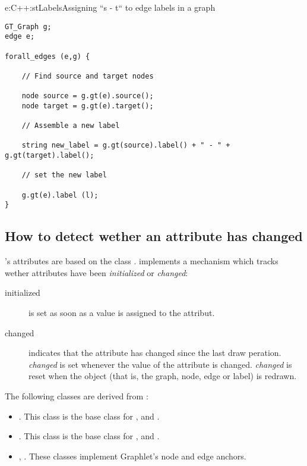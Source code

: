 \documentclass[twoside,fleqn]{report}
\begin{document}
\begin{example}{e:C++:stLabels}{Assigning ``s - t`` to edge labels in a 
graph}
\begin{verbatim}
GT_Graph g;
edge e;

forall_edges (e,g) {

    // Find source and target nodes

    node source = g.gt(e).source();
    node target = g.gt(e).target();

    // Assemble a new label

    string new_label = g.gt(source).label() + " - " + g.gt(target).label();
    
    // set the new label

    g.gt(e).label (l);
}
\end{verbatim}
\end{example}


%
%

\subsection{How to detect wether an attribute has changed}
\label{s:DetectingChangesInAttributes}

\Graphlet{}'s attributes are based on the class
.   implements a
mechanism which tracks wether attributes have been
\emph{initialized} or \emph{changed}:

\begin{description}

\item[initialized] is set as soon as a value is assigned to the 
attribut.

\item[changed] indicates that the attribute has changed since the
last draw peration.  \emph{changed} is set whenever the
value of the attribute is changed.  \emph{changed} is reset when
the object (that is, the graph, node, edge or label) is redrawn.

\end{description}

\noindent The following classes are derived from :

\begin{itemize}

  \item {}. This class is the base class for
  ,  and
  .

  \item {}. This class is the base class for
  ,  and
  .
  
  \item {}, . These classes implement
  Graphlet's node and edge anchors.

\end{itemize}
\end{document}
